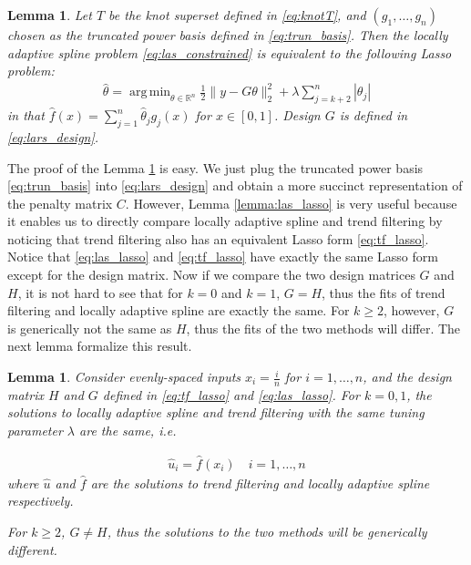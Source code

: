 \documentclass[a4paper]{article}
\DeclareMathOperator*{\argmin}{arg\,min}
\newtheorem{lemma}[theorem]{Lemma}
\newcommand{\RR}{\mathbb{R}}
\begin{document}
\begin{lemma}
Let $T$ be the knot superset defined in \eqref{eq:knotT}, and $(g_1,\ldots, g_n)$ chosen as the truncated power basis defined in \eqref{eq:trun_basis}. Then the locally adaptive spline problem \eqref{eq:las_constrained} is equivalent to the following Lasso problem:
\begin{align}
\hat{\theta} = \argmin_{\theta\in\RR^n}\frac{1}{2}\|y-G\theta\|_2^2 + \lambda\sum_{j=k+2}^n |\theta_j|
\label{eq:las_lasso}
\end{align}
in that $\hat{f}(x) = \sum_{j=1}^n \hat{\theta}_jg_j(x)$ for $x\in[0, 1]$. Design $G$ is defined in \eqref{eq:lars_design}.
\label{lemma:las_lasso}
\end{lemma}

The proof of the Lemma \ref{lemma:las_lasso} is easy. We just plug the truncated power basis \eqref{eq:trun_basis} into \eqref{eq:lars_design} and obtain a more succinct representation of the penalty matrix $C$. However, Lemma \eqref{lemma:las_lasso} is very useful because it enables us to directly compare locally adaptive spline and trend filtering by noticing that trend filtering also has an equivalent Lasso form \eqref{eq:tf_lasso}. Notice that \eqref{eq:las_lasso} and \eqref{eq:tf_lasso} have exactly the same Lasso form except for the design matrix. Now if we compare the two design matrices $G$ and $H$, it is not hard to see that for $k = 0$ and $k = 1$, $G = H$, thus the fits of trend filtering and locally adaptive spline are exactly the same. For $k\geq 2$, however, $G$ is generically not the same as $H$, thus the fits of the two methods will differ. The next lemma formalize this result. 

\begin{lemma}
Consider evenly-spaced inputs $x_i = \frac{i}{n}$ for $i= 1,\ldots, n$, and the design matrix $H$ and $G$ defined in \eqref{eq:tf_lasso} and \eqref{eq:las_lasso}. For $k = 0, 1$, the solutions to locally adaptive spline and trend filtering with the same tuning parameter $\lambda$ are the same, i.e.

\begin{align*}
\hat{u}_i = \hat{f}(x_i) \quad i=1,\ldots, n
\end{align*}
where $\hat{u}$ and $\hat{f}$ are the solutions to trend filtering and locally adaptive spline respectively.

For $k\geq 2$, $G\neq H$, thus the solutions to the two methods will be generically different. 
\label{lemma:lasequivtf}
\end{lemma}
\end{document}
